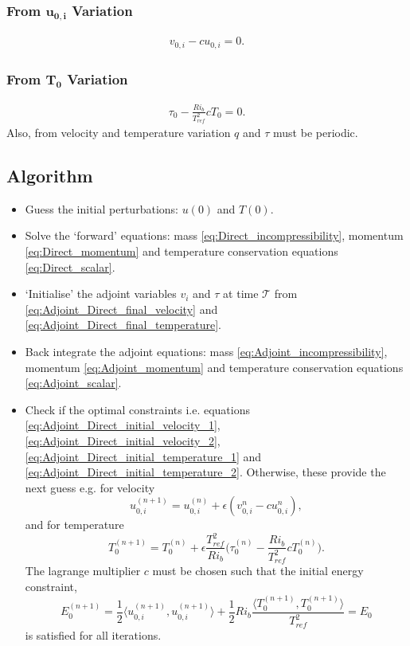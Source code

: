 \documentclass[preprint,12pt]{article}
\begin{document}
\begin{tcolorbox}
\subsubsection*{From $\mathbf{u_{0,i}}$ Variation}
\begin{align}\label{eq:Adjoint_Direct_initial_velocity_2}
v_{0,i}-cu_{0,i}=0.
\end{align}
\subsubsection*{From $\mathbf{T_{0}}$ Variation}
\begin{align}\label{eq:Adjoint_Direct_initial_temperature_2}
\tau_{0}-\frac{Ri_b}{T_{ref}^2}cT_{0}=0.
\end{align}
Also, from velocity and temperature variation $q$ and $\tau$ must be periodic.
\end{tcolorbox}
\subsection{Algorithm}
\begin{tcolorbox}
\begin{itemize}
	\item Guess the initial perturbations: $u(0)$ and $T(0)$.
	\item Solve the `forward' equations: mass \eqref{eq:Direct_incompressibility}, momentum \eqref{eq:Direct_momentum} and temperature conservation equations \eqref{eq:Direct_scalar}.
	\item `Initialise' the adjoint variables $v_i$ and $\tau$ at time $\mathcal{T}$ from \eqref{eq:Adjoint_Direct_final_velocity} and \eqref{eq:Adjoint_Direct_final_temperature}.\\
	\item Back integrate the adjoint equations: mass \eqref{eq:Adjoint_incompressibility}, momentum \eqref{eq:Adjoint_momentum} and temperature conservation equations \eqref{eq:Adjoint_scalar}.
	\item Check if the optimal constraints i.e. equations \eqref{eq:Adjoint_Direct_initial_velocity_1}, \eqref{eq:Adjoint_Direct_initial_velocity_2}, \eqref{eq:Adjoint_Direct_initial_temperature_1} and \eqref{eq:Adjoint_Direct_initial_temperature_2}. Otherwise, these provide the next guess e.g. for velocity
	\begin{equation}
	u_{0,i}^{(n+1)}=u_{0,i}^{(n)}+{\epsilon}(v_{0,i}^{n}-cu_{0,i}^{n}),
	\end{equation}
	and for temperature
	\begin{equation}
	T_{0}^{(n+1)}=T_{0}^{(n)}+{\epsilon}\frac{T_{ref}^2}{Ri_b}\bigg(\tau_{0}^{(n)}-\frac{Ri_b}{T_{ref}^2}cT_{0}^{(n)}\bigg).
	\end{equation}
	The lagrange multiplier $c$ must be chosen such that the initial energy constraint,
	\begin{equation}
	E_0^{(n+1)}=\frac{1}{2}\Big\langle u_{0,i}^{(n+1)},u_{0,i}^{(n+1)}\Big\rangle+\frac{1}{2}Ri_b \frac{\langle T_{0}^{(n+1)},T_{0}^{(n+1)}\rangle}{T_{ref}^2}=E_0
	\end{equation}
	is satisfied for all iterations.
\end{itemize}
\end{tcolorbox}
\end{document}
